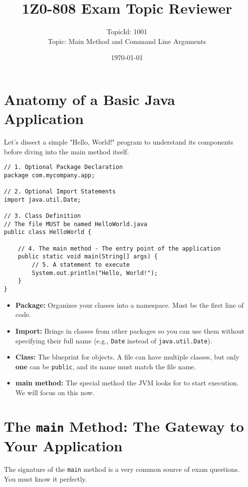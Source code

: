 \documentclass[12pt]{article}
\title{\textbf{1Z0-808 Exam Topic Reviewer}}
\author{TopicId: 1001 \\ Topic: Main Method and Command Line Arguments}
\date{\today}
\begin{document}
\maketitle
\newpage\begin{enumerate}[label=(\arabic*)]
\section*{Anatomy of a Basic Java Application}
Let's dissect a simple "Hello, World!" program to understand its components before diving into the main method itself.

\begin{verbatim}
// 1. Optional Package Declaration
package com.mycompany.app;

// 2. Optional Import Statements
import java.util.Date;

// 3. Class Definition
// The file MUST be named HelloWorld.java
public class HelloWorld {

    // 4. The main method - The entry point of the application
    public static void main(String[] args) {
        // 5. A statement to execute
        System.out.println("Hello, World!");
    }
}
\end{verbatim}

\begin{itemize}
    \item \textbf{Package:} Organizes your classes into a namespace. Must be the first line of code.
    \item \textbf{Import:} Brings in classes from other packages so you can use them without specifying their full name (e.g., \texttt{Date} instead of \texttt{java.util.Date}).
    \item \textbf{Class:} The blueprint for objects. A file can have multiple classes, but only \textbf{one} can be \texttt{public}, and its name must match the file name.
    \item \textbf{main method:} The special method the JVM looks for to start execution. We will focus on this now.
\end{itemize}

\section{The \texttt{main} Method: The Gateway to Your Application}
The signature of the \texttt{main} method is a very common source of exam questions. You must know it perfectly.


\end{enumerate}
\end{document}
